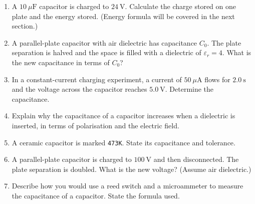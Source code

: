 \documentclass[11pt]{article}
\begin{document}
\begin{exercice}
\begin{enumerate}
    \item A $10\ \mu\mathrm{F}$ capacitor is charged to $24\ \mathrm{V}$. Calculate the charge stored on one plate and the energy stored. (Energy formula will be covered in the next section.)
    \item A parallel-plate capacitor with air dielectric has capacitance $C_0$. The plate separation is halved and the space is filled with a dielectric of $\varepsilon_r = 4$. What is the new capacitance in terms of $C_0$?
    \item In a constant-current charging experiment, a current of $50\ \mu\mathrm{A}$ flows for $2.0\ \mathrm{s}$ and the voltage across the capacitor reaches $5.0\ \mathrm{V}$. Determine the capacitance.
    \item Explain why the capacitance of a capacitor increases when a dielectric is inserted, in terms of polarisation and the electric field.
    \item A ceramic capacitor is marked \texttt{473K}. State its capacitance and tolerance.
    \item A parallel-plate capacitor is charged to $100\ \mathrm{V}$ and then disconnected. The plate separation is doubled. What is the new voltage? (Assume air dielectric.)
    \item Describe how you would use a reed switch and a microammeter to measure the capacitance of a capacitor. State the formula used.
\end{enumerate}
\end{exercice}
\end{document}
